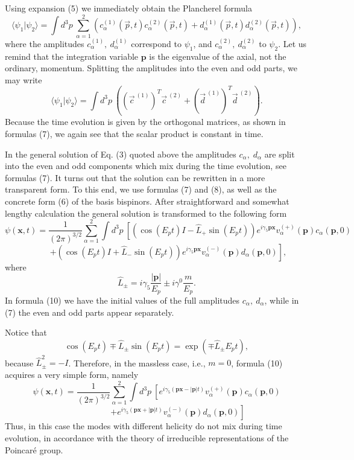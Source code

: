 \documentclass[12pt]{article}
\begin{document}
Using  expansion (5)  we immediately obtain the Plancherel formula
\[ \langle \psi_1| \psi_2 \rangle =  \int\! d^3p \: \sum^2_{\alpha=1} \left(c^{(1)}_{\alpha}(\vec{p},t) c^{(2)}_{\alpha}(\vec{p},t) + d^{(1)}_{\alpha}(\vec{p},t) d^{(2)}_{\alpha}(\vec{p},t)\right), \] 
where the amplitudes $c^{(1)}_{\alpha}, \:d^{(1)}_{\alpha}$ correspond to $\psi_1$, and    $c^{(2)}_{\alpha}, \: d^{(2)}_{\alpha} $ to $\psi_2$.  Let us remind that the integration variable $\mathbf{p}$ is the eigenvalue of the axial, not the ordinary,  momentum.    Splitting the amplitudes into the even and odd parts, we may write
\begin{equation} \langle \psi_1| \psi_2 \rangle =  \int\! d^3p \: \left( (\vec{c}^{\:(1)})^T \vec{c}^{\:(2)} +  (\vec{d}^{\:(1)})^T \vec{d}^{\:(2)} \right).   \end{equation}
Because the time evolution is given by the  orthogonal matrices, as shown in  formulas (7),  we again see that the scalar product is constant in time. 


In the   general solution of Eq. (3)  quoted above  the amplitudes $c_{\alpha},\; d_{\alpha}$ are split into the even and odd components  which  mix  during the  time evolution,  see formulas (7).  It turns out that  the solution can be rewritten in a  more transparent form.  To this end,  we use formulas (7) and  (8), as well as  the concrete form (6)  of the basis bispinors. After straightforward and somewhat lengthy calculation the general solution  is transformed to the following form
\begin{equation}
\psi(\mathbf{x}, t) = \frac{1}{(2\pi)^{3/2}} \sum_{\alpha=1}^2 \int\!d^3p\: \left[\left(\cos(E_pt) I - \hat{L}_+  \sin(E_pt)  \right)   e^{i \gamma_5 \mathbf{p} \mathbf{x}} v_{\alpha}^{( +)}(\mathbf{p})  c_{\alpha}(\mathbf{p},0)  \right. \end{equation} \[ \;\;\;\;\;\;\;\;\;\;\left. +  \left(\cos(E_pt) I + \hat{L}_- \sin(E_pt)  \right)
  e^{i \gamma_5 \mathbf{p} \mathbf{x}}
 v_{\alpha}^{( -)}(\mathbf{p})  d_{\alpha}(\mathbf{p},0)\right],
\]
where 
\[ \hat{L}_{\pm} =  i \gamma_5 \frac{|\mathbf{p}|}{E_p}  \pm  i \gamma^0 \frac{m}{E_p}. \]
In  formula (10)  we have the initial values of  the full amplitudes $c_{\alpha}, \: d_{\alpha}$,  while in (7) the even and odd  parts appear separately. 


Notice that 
\[ \cos(E_pt) \mp \hat{L}_{\pm}  \sin(E_pt) = \exp(\mp \hat{L}_{\pm} E_p t), \] because  $\hat{L}_{\pm}^2 = -I$. Therefore, 
in the massless case, i.e.,  $m=0$, formula (10) acquires a very simple form, namely  
\begin{equation}
\psi(\mathbf{x}, t) = \frac{1}{(2\pi)^{3/2}} \sum_{\alpha=1}^2 \int\!d^3p\: \left[  e^{i \gamma_5 (\mathbf{p} \mathbf{x}  - |\mathbf{p}| t)} v_{\alpha}^{( +)}(\mathbf{p}) c_{\alpha}(\mathbf{p},0)   \right.  \end{equation} \[ \;\;\;\;\;\;\;\;\; \;\;\;\;\;\;\;\;\;  \left.+  e^{i \gamma_5 (\mathbf{p} \mathbf{x}  + |\mathbf{p}| t)}v_{\alpha}^{( -)}(\mathbf{p})  d_{\alpha}(\mathbf{p},0)  \right]
\]
Thus, in this case the modes with different helicity do not mix during time evolution, in accordance with the theory of  irreducible representations of the Poincar\'e group. 
\end{document}
